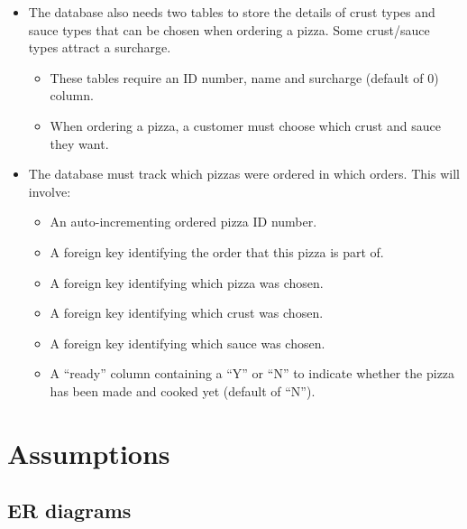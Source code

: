 \begin{itemize}
\item The database also needs two tables to store the details of crust types and sauce types that can be chosen when ordering a pizza. Some crust/sauce types attract a surcharge.
	\begin{itemize}
	\item These tables require an ID number, name and surcharge (default of 0) column.
	\item When ordering a pizza, a customer must choose which crust and sauce they want.
	\end{itemize}
\item The database must track which pizzas were ordered in which orders. This will involve:
	\begin{itemize}
	\item An auto-incrementing ordered pizza ID number.
	\item A foreign key identifying the order that this pizza is part of.
	\item A foreign key identifying which pizza was chosen.
	\item A foreign key identifying which crust was chosen.
	\item A foreign key identifying which sauce was chosen.
	\item A ``ready'' column containing a ``Y'' or ``N'' to indicate whether the pizza has been made and cooked yet (default of ``N'').
	\end{itemize}
\end{itemize}

\section{Assumptions}

\subsection{ER diagrams}

